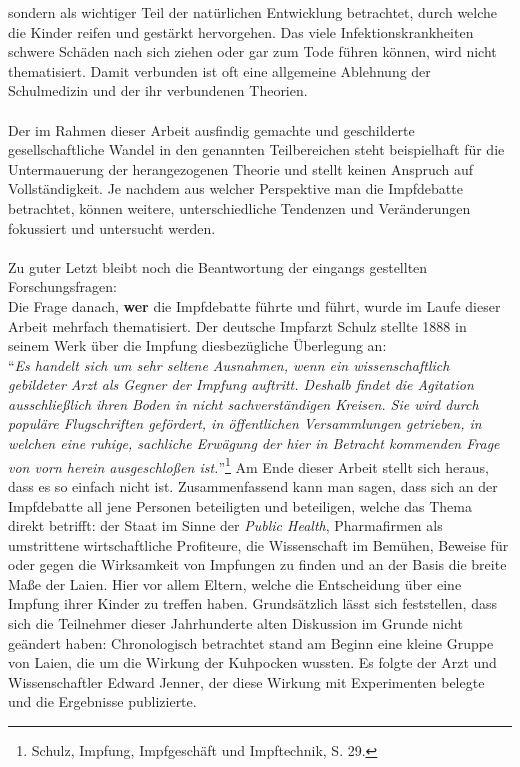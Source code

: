 \documentclass[
    a4paper,
    12pt,
    hyphens,
    chapterprefix=true,
    headheight=33pt,
    footheight=29pt,
    headings=optiontohead, %
]{scrartcl}
\begin{document}
{sondern als wichtiger Teil der natürlichen Entwicklung betrachtet, durch
welche die Kinder reifen und gestärkt hervorgehen. Das viele
Infektionskrankheiten schwere Schäden nach sich ziehen oder gar zum
Tode führen können, wird nicht thematisiert. Damit verbunden ist oft eine
allgemeine Ablehnung der Schulmedizin und der ihr verbundenen Theorien. \\
\\
Der im Rahmen dieser Arbeit ausfindig gemachte und geschilderte gesellschaftliche Wandel in den genannten Teilbereichen steht beispielhaft für die Untermauerung der herangezogenen Theorie und stellt keinen Anspruch auf Vollständigkeit. Je nachdem aus welcher Perspektive man die Impfdebatte betrachtet, können weitere, unterschiedliche Tendenzen und Veränderungen fokussiert und untersucht werden. \\
\\
Zu guter Letzt bleibt noch die Beantwortung der eingangs gestellten Forschungsfragen:\\
Die Frage danach, \textbf{wer} die Impfdebatte führte und führt, wurde im Laufe dieser Arbeit mehrfach  thematisiert. Der deutsche Impfarzt Schulz stellte 1888 in seinem Werk über die Impfung diesbezügliche Überlegung an:\\
"`\textit{Es handelt sich um sehr seltene Ausnahmen, wenn ein wissenschaftlich gebildeter Arzt als Gegner der Impfung auftritt. Deshalb findet die Agitation ausschließlich ihren Boden in nicht sachverständigen Kreisen. Sie wird durch populäre Flugschriften gefördert, in öffentlichen Versammlungen getrieben, in welchen eine ruhige, sachliche Erwägung der hier in Betracht kommenden Frage von vorn herein ausgeschloßen ist.}"'\footnote{Schulz, Impfung, Impfgeschäft und Impftechnik, S. 29.}
Am Ende dieser Arbeit stellt sich heraus, dass es so einfach nicht ist. Zusammenfassend kann man sagen, dass sich an der Impfdebatte all jene Personen beteiligten und beteiligen, welche das Thema direkt betrifft: der Staat im Sinne der \textit{Public Health}, Pharmafirmen als umstrittene wirtschaftliche Profiteure, die Wissenschaft im Bemühen, Beweise für oder gegen die Wirksamkeit von Impfungen zu finden und an der Basis die breite Maße der Laien. Hier vor allem Eltern, welche die Entscheidung über eine Impfung ihrer Kinder zu treffen haben. Grundsätzlich lässt sich feststellen, dass sich die Teilnehmer dieser Jahrhunderte alten Diskussion im Grunde nicht geändert haben: Chronologisch betrachtet stand am Beginn eine kleine Gruppe von Laien, die um die Wirkung der Kuhpocken wussten. Es folgte der Arzt und Wissenschaftler Edward Jenner, der diese Wirkung mit Experimenten belegte und die Ergebnisse publizierte.
}
\end{document}
